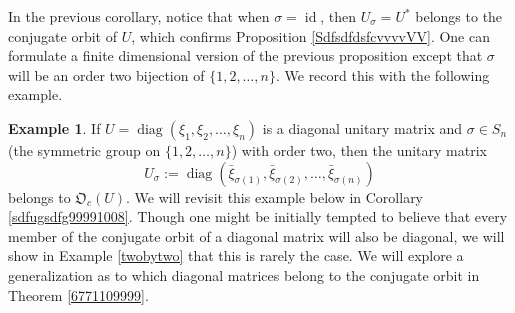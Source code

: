 \documentclass{dis}
\theoremstyle{plain}
\theoremstyle{definition}
\newtheorem{Example}[equation]{Example}
\newcommand{\0}{{\color{lightgray}0}}
\begin{document}
In the previous corollary, notice that when $\sigma = \operatorname{id}$, then $U_{\sigma} = U^{*}$ belongs to the conjugate orbit of $U$, which confirms Proposition \ref{SdfsdfdsfcvvvvVV}. One can formulate a finite dimensional version of the previous proposition except that $\sigma$ will be an order two bijection of $\{1, 2, \ldots, n\}$. We record this with the following example. 

\begin{Example}\label{Ex2too}
If
$U = \operatorname{diag}(\xi_1, \xi_2, \ldots, \xi_n)$ is a diagonal unitary matrix and $\sigma \in S_{n}$ (the symmetric group on $\{1, 2, \ldots, n\}$) with order two, then the unitary matrix 
$$U_{\sigma} := \operatorname{diag}(\bar \xi_{\sigma(1)}, \bar \xi_{\sigma(2)}, \ldots,  \bar \xi_{\sigma(n)})$$ belongs to $\mathfrak{O}_c(U)$. We will revisit this example below in Corollary \ref{sdfugsdfg99991008}.
Though one might be initially tempted to believe that every member of the conjugate orbit of a diagonal matrix will also be diagonal, we will show in Example \ref{twobytwo} that this is rarely  the case. 
We will explore a generalization as to which diagonal matrices belong to the conjugate orbit in Theorem \ref{6771109999}. 
\end{Example}
\end{document}
